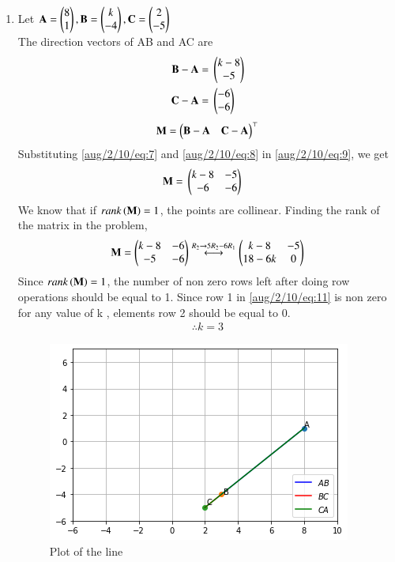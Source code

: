 \begin{enumerate}
\item Let $\mathbf{A}=\begin{pmatrix}8\\1\end{pmatrix}, \mathbf{B}=\begin{pmatrix}k \\ -4\end{pmatrix}, \mathbf{C}=\begin{pmatrix}2 \\ -5\end{pmatrix}$\\
The direction vectors of AB and AC are
\begin{align}
\label{aug/2/10/eq:7}
\mathbf{B} - \mathbf{A} ={}& \begin{pmatrix}k-8\\-5\end{pmatrix}\\
\label{aug/2/10/eq:8}
\mathbf{C} - \mathbf{A} ={}& \begin{pmatrix}-6 \\ -6\end{pmatrix}
\end{align}
\begin{align}
\label{aug/2/10/eq:9}
\mathbf{M} =\begin{pmatrix}\mathbf{B}-\mathbf{A} & \mathbf{C}-\mathbf{A}\end{pmatrix}^\top
\end{align}
Substituting \eqref{aug/2/10/eq:7} and \eqref{aug/2/10/eq:8} in \eqref{aug/2/10/eq:9}, we get
\begin{align}
\label{aug/2/10/eq:10}
\mathbf{M}={}&\begin{pmatrix}k-8 & -5 \\ -6 & -6\end{pmatrix}
\end{align}
We know that if $rank\left(\mathbf{M}\right)=1$, the points are collinear.
Finding the rank of the matrix in the problem,
\begin{align}
\label{aug/2/10/eq:11}
\mathbf{M} = \begin{pmatrix}k-8 & -6 \\ -5 & -6\end{pmatrix} \overset{R_{2}\rightarrow 5R_{2}-6R_{1}}{\longleftrightarrow} \begin{pmatrix}k-8 & -5 \\ 18-6k & 0\end{pmatrix}
\end{align}
Since $rank\left(\mathbf{M}\right)=1$, the number of non zero rows left after doing row operations should be equal to 1.
Since row 1 in \eqref{aug/2/10/eq:11} is non zero for any value of k , elements row 2 should be equal to 0.
\begin{align}
\therefore k=3
\end{align}

\begin{figure}[!h]
\centering
\includegraphics[width=\columnwidth]{solutions/aug/2/10/Figures/q1b.png}
\caption{Plot of the line}
\end{figure}

\end{enumerate}



